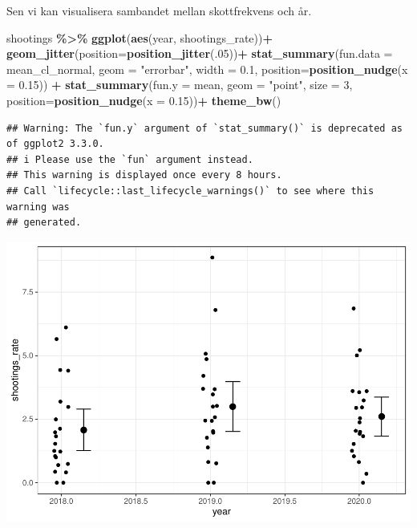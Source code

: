 \documentclass[
]{book}
\newenvironment{Shaded}{\begin{snugshade}}{\end{snugshade}}
\newcommand{\AttributeTok}[1]{\textcolor[rgb]{0.13,0.29,0.53}{#1}}
\newcommand{\DecValTok}[1]{\textcolor[rgb]{0.00,0.00,0.81}{#1}}
\newcommand{\FloatTok}[1]{\textcolor[rgb]{0.00,0.00,0.81}{#1}}
\newcommand{\FunctionTok}[1]{\textcolor[rgb]{0.13,0.29,0.53}{\textbf{#1}}}
\newcommand{\NormalTok}[1]{#1}
\newcommand{\SpecialCharTok}[1]{\textcolor[rgb]{0.81,0.36,0.00}{\textbf{#1}}}
\newcommand{\StringTok}[1]{\textcolor[rgb]{0.31,0.60,0.02}{#1}}
\begin{document}
Sen vi kan visualisera sambandet mellan skottfrekvens och år.

\begin{Shaded}
\begin{Highlighting}[]
\NormalTok{shootings }\SpecialCharTok{\%\textgreater{}\%} 
 \FunctionTok{ggplot}\NormalTok{(}\FunctionTok{aes}\NormalTok{(year, shootings\_rate))}\SpecialCharTok{+}
  \FunctionTok{geom\_jitter}\NormalTok{(}\AttributeTok{position=}\FunctionTok{position\_jitter}\NormalTok{(.}\DecValTok{05}\NormalTok{))}\SpecialCharTok{+}
  \FunctionTok{stat\_summary}\NormalTok{(}\AttributeTok{fun.data =}\NormalTok{ mean\_cl\_normal, }\AttributeTok{geom =} \StringTok{"errorbar"}\NormalTok{, }
        \AttributeTok{width =} \FloatTok{0.1}\NormalTok{, }\AttributeTok{position=}\FunctionTok{position\_nudge}\NormalTok{(}\AttributeTok{x =} \FloatTok{0.15}\NormalTok{)) }\SpecialCharTok{+}
    \FunctionTok{stat\_summary}\NormalTok{(}\AttributeTok{fun.y =}\NormalTok{ mean, }\AttributeTok{geom =} \StringTok{"point"}\NormalTok{,}
        \AttributeTok{size =} \DecValTok{3}\NormalTok{, }\AttributeTok{position=}\FunctionTok{position\_nudge}\NormalTok{(}\AttributeTok{x =} \FloatTok{0.15}\NormalTok{))}\SpecialCharTok{+}
  \FunctionTok{theme\_bw}\NormalTok{()}
\end{Highlighting}
\end{Shaded}

\begin{verbatim}
## Warning: The `fun.y` argument of `stat_summary()` is deprecated as of ggplot2 3.3.0.
## i Please use the `fun` argument instead.
## This warning is displayed once every 8 hours.
## Call `lifecycle::last_lifecycle_warnings()` to see where this warning was
## generated.
\end{verbatim}

\includegraphics{_main_files/figure-latex/unnamed-chunk-29-1.pdf}

  
\end{document}
